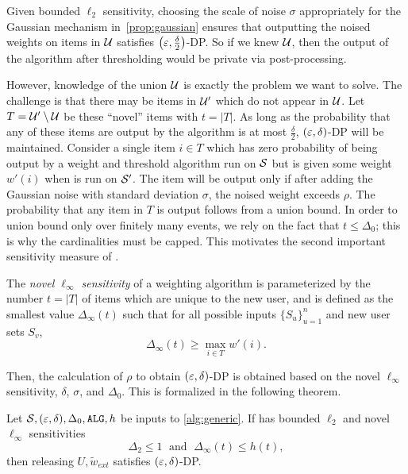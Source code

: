 Given bounded $\ell_2$ sensitivity, choosing the scale of noise $\sigma$ appropriately for the Gaussian mechanism in~\cref{prop:gaussian} ensures that outputting the noised weights on items in $\mathcal{U}$ satisfies $\left(\varepsilon, \frac{\delta}{2} \right)$-DP.
So if we knew $\mathcal{U}$, then the output of the algorithm after thresholding would be private via post-processing.

However, knowledge of the union $\mathcal{U}$ is exactly the problem we want to solve. The challenge is that there may be items in $\mathcal{U}'$ which do not appear in $\mathcal{U}$. Let $T = \mathcal{U}' \setminus \mathcal{U}$ be these ``novel'' items with $t = |T|$. As long as the probability that any of these items are output by the algorithm is at most $\frac{\delta}{2}$, $(\varepsilon, \delta)$-DP will be maintained. Consider a single item $i \in T$ which has zero probability of being output by a weight and threshold algorithm run on $\mathcal{S}$ but is given some weight $w'(i)$ when \weightalgo{} is run on $\mathcal{S}'$. The item will be output only if after adding the Gaussian noise with standard deviation $\sigma$, the noised weight exceeds $\rho$. The probability that any item in $T$ is output follows from a union bound. In order to union bound only over finitely many events, we rely on the fact that $t \leq \Delta_0$; this is why the cardinalities must be capped.
This motivates the second important sensitivity measure of \weightalgo{}.

\begin{definition}\label{def:linf-sensitivity}
The \emph{novel $\ell_\infty$ sensitivity} of a weighting algorithm is parameterized by the number $t = |T|$ of items which are unique to the new user,  and is defined as the smallest value $\Delta_\infty(t)$ such that for all possible inputs $\{S_u\}_{u=1}^n$ and new user sets $S_v$,
\begin{equation*}
    \Delta_\infty(t) \geq \max_{i \in T} w'(i).
\end{equation*}
\end{definition}
Then, the calculation of $\rho$ to obtain $(\varepsilon, \delta)$-DP is obtained based on the novel $\ell_\infty$ sensitivity, $\delta$, $\sigma$, and $\Delta_0$. This is formalized in the following theorem.

\begin{theorem}\label{thm:generic-privacy}
Let $\mathcal{S}, (\varepsilon, \delta), \Delta_0, \texttt{ALG}{}, h$  be inputs to \cref{alg:generic}. 
If \weightalgo{} has bounded $\ell_2$ and novel $\ell_\infty$ sensitivities
\[
    \Delta_2 \leq 1 \; \text{ and } \; \Delta_\infty(t) \leq h(t),
\]
then releasing $U, \tilde{w}_{ext}$ satisfies $(\varepsilon, \delta)$-DP.
\end{theorem}


